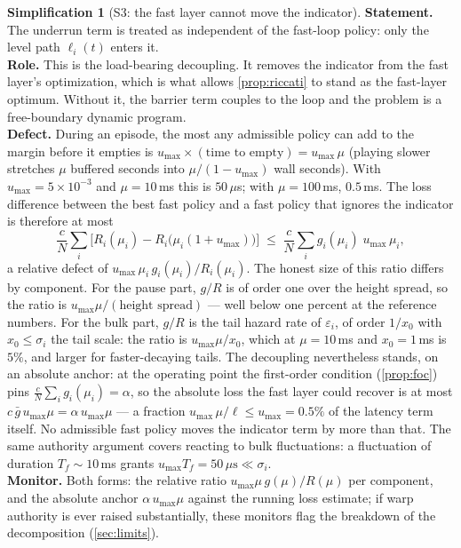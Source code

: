 \documentclass[11pt, a4paper]{article}
\theoremstyle{definition}
\newtheorem{simplification}{Simplification}
\theoremstyle{plain}
\theoremstyle{remark}
\begin{document}
\begin{simplification}[S3: the fast layer cannot move the indicator]
\label{simp:actuation}
\textbf{Statement.}  The underrun term is treated as independent of the
fast-loop policy: only the level path $\ell_i(t)$ enters it.\\
\textbf{Role.}  This is the load-bearing decoupling.  It removes the
indicator from the fast layer's optimization, which is what allows
\cref{prop:riccati} to stand as the fast-layer optimum.  Without it,
the barrier term couples to the loop and the problem is a free-boundary
dynamic program.\\
\textbf{Defect.}  During an episode, the most any admissible policy can
add to the margin before it empties is
$u_{\max} \times (\text{time to empty}) = u_{\max}\,\mu$ (playing
slower stretches $\mu$ buffered seconds into $\mu/(1-u_{\max})$ wall
seconds).  With $u_{\max} = 5\times10^{-3}$ and $\mu = 10$\,ms this is
$50\,\mu$s; with $\mu = 100$\,ms, $0.5$\,ms.  The loss difference
between the best fast policy and a fast policy that ignores the
indicator is therefore at most
\[
  \frac{c}{N}\sum_i\bigl[R_i(\mu_i) - R_i\bigl(\mu_i(1{+}u_{\max})\bigr)\bigr]
  \;\le\;
  \frac{c}{N}\sum_i g_i(\mu_i)\; u_{\max}\,\mu_i ,
\]
a relative defect of $u_{\max}\,\mu_i\,g_i(\mu_i)/R_i(\mu_i)$.  The
honest size of this ratio differs by component.  For the pause part,
$g/R$ is of order one over the height spread, so the ratio is
$u_{\max}\mu/(\text{height spread})$ --- well below one percent at the
reference numbers.  For the bulk part, $g/R$ is the tail hazard rate
of $\varepsilon_i$, of order $1/x_0$ with $x_0 \le \sigma_i$ the tail
scale: the ratio is $u_{\max}\mu/x_0$, which at $\mu = 10$\,ms and
$x_0 = 1$\,ms is $5\%$, and larger for faster-decaying tails.  The
decoupling nevertheless stands, on an absolute anchor: at the
operating point the first-order condition (\cref{prop:foc}) pins
$\tfrac{c}{N}\sum_i g_i(\mu_i) = \alpha$, so the absolute loss the
fast layer could recover is at most
$c\,\bar g\,u_{\max}\mu = \alpha\,u_{\max}\mu$ --- a fraction
$u_{\max}\,\mu/\ell \le u_{\max} = 0.5\%$ of the latency term itself.
No admissible fast policy moves the indicator term by more than
that.
The same authority argument covers reacting to bulk fluctuations: a
fluctuation of duration $T_f \sim 10$\,ms grants
$u_{\max}T_f = 50\,\mu\mathrm{s} \ll \sigma_i$.\\
\textbf{Monitor.}  Both forms: the relative ratio
$u_{\max}\mu\,g(\mu)/R(\mu)$ per component, and the absolute anchor
$\alpha\,u_{\max}\mu$ against the running loss estimate; if warp
authority is ever raised substantially, these monitors flag the
breakdown of the decomposition (\cref{sec:limits}).
\end{simplification}
\end{document}
